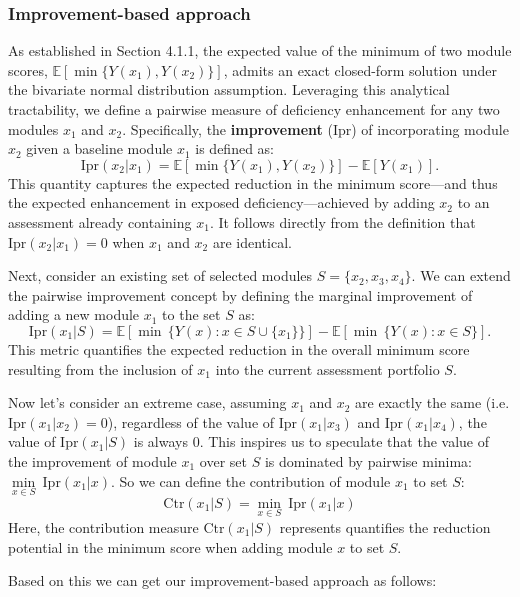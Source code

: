 \documentclass[opre,sglanonrev]{informs4}
\begin{document}
\subsubsection{Improvement-based approach}
As established in Section 4.1.1, the expected value of the minimum of two module scores, $\mathbb{E}[\min\{Y(x_1), Y(x_2)\}]$, admits an exact closed-form solution under the bivariate normal distribution assumption. Leveraging this analytical tractability, we define a pairwise measure of deficiency enhancement for any two modules $x_1$ and $x_2$. Specifically, the \textbf{improvement} (Ipr) of incorporating module $x_2$ given a baseline module $x_1$ is defined as:
$$
\text{Ipr}(x_2 | x_1) = \mathbb{E}[\min\{Y(x_1), Y(x_2)\}] - \mathbb{E}[Y(x_1)].
$$
This quantity captures the expected reduction in the minimum score---and thus the expected enhancement in exposed deficiency---achieved by adding $x_2$ to an assessment already containing $x_1$. It follows directly from the definition that $\text{Ipr}(x_2 | x_1) = 0$ when $x_1$ and $x_2$ are identical.

Next, consider an existing set of selected modules $S = \{x_2, x_3, x_4\}$. We can extend the pairwise improvement concept by defining the marginal improvement of adding a new module $x_1$ to the set $S$ as:
$$
\text{Ipr}(x_1 | S) = \mathbb{E}\left[\min\,\{Y(x) : x \in S \cup \{x_1\}\}\right] - \mathbb{E}\left[\min\,\{Y(x) : x \in S\}\right].
$$
This metric quantifies the expected reduction in the overall minimum score resulting from the inclusion of $x_1$ into the current assessment portfolio $S$.

Now let's consider an extreme case, assuming $x_1$ and $x_2$ are exactly the same (i.e. $\text{Ipr}(x_1|x_2)=0$), regardless of the value of $\text{Ipr}(x_1|x_3)$ and $\text{Ipr}(x_1|x_4)$, the value of $\text{Ipr}(x_1|S)$ is always $0$. This inspires us to speculate that the value of the improvement of module $x_1$ over set $S$ is dominated by pairwise minima: $\underset{x\in S}{{\min}}~\text{Ipr}(x_1|x)$. So we can define the contribution of module $x_1$ to set $S$: 
$$
\text{Ctr}(x_1|S) = \underset{x\in S}{{\min}}~\text{Ipr}(x_1|x)
$$
Here, the contribution measure $\text{Ctr}(x_1|S)$ represents quantifies the reduction potential in the minimum score when adding module $x$ to set $S$.

Based on this we can get our improvement-based approach as follows:
\end{document}
